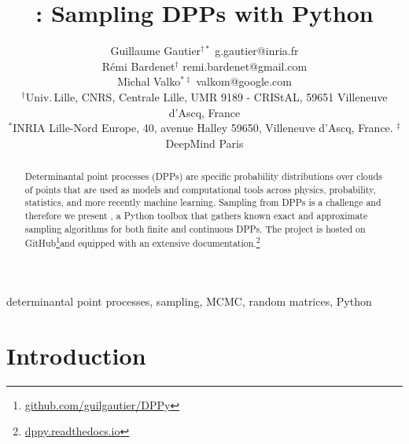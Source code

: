 \documentclass[twoside,11pt]{article}
\begin{document}
\title{\DPPy: Sampling DPPs with Python}

\author{\name Guillaume Gautier$^{\dagger*}$ \email g.gautier@inria.fr \\
       \name R\'emi Bardenet$^\dagger$ \email remi.bardenet@gmail.com \\
       \name Michal Valko$^{*\ddag}$ \email valkom@google.com\\
       \addr $^\dagger$Univ.\,Lille, CNRS, Centrale Lille, UMR 9189 - CRIStAL, 59651 Villeneuve d'Ascq, France\\
       \addr $^*$INRIA Lille-Nord Europe, 40, avenue Halley 59650, Villeneuve d'Ascq, France. \addr $^\ddag$DeepMind Paris
}

\editor{}

\maketitle

\vspace{-2em}
\setcounter{footnote}{3}
\begin{abstract}%
    Determinantal point processes (DPPs) are specific probability distributions over clouds of points that are used as models and computational tools across physics, probability, statistics, and more recently machine learning.
    Sampling from DPPs is a challenge and therefore we present \DPPy, a Python toolbox that gathers known exact and approximate sampling algorithms for both finite and continuous DPPs.
    The project is hosted on GitHub\!\footnote{\label{fn:github}\href{https://github.com/guilgautier/DPPy}{\textsf{github.com/guilgautier/DPPy}}}and equipped with an extensive documentation.\!\!\footnote{\label{fn:docs}\href{https://dppy.readthedocs.io}{\textsf{dppy.readthedocs.io}}}
\end{abstract}

\begin{keywords}%
    determinantal point processes,
    sampling,
    MCMC,
    random matrices,
    Python
\end{keywords}

\section{Introduction} %
\label{sec:introduction}
\end{document}
